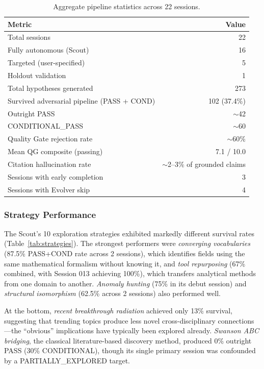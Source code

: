 \begin{table}[htbp]
\centering
\caption{Aggregate pipeline statistics across 22 sessions.}
\label{tab:aggregate}
\small
\begin{tabular}{@{}lr@{}}
\toprule
\textbf{Metric} & \textbf{Value} \\
\midrule
Total sessions & 22 \\
\quad Fully autonomous (Scout) & 16 \\
\quad Targeted (user-specified) & 5 \\
\quad Holdout validation & 1 \\
Total hypotheses generated & 273 \\
Survived adversarial pipeline (PASS + COND) & 102 (37.4\%) \\
\quad Outright PASS & $\sim$42 \\
\quad CONDITIONAL\_PASS & $\sim$60 \\
Quality Gate rejection rate & $\sim$60\% \\
Mean QG composite (passing) & 7.1 / 10.0 \\
Citation hallucination rate & $\sim$2--3\% of grounded claims \\
Sessions with early completion & 3 \\
Sessions with Evolver skip & 4 \\
\bottomrule
\end{tabular}
\end{table}

\subsubsection{Strategy Performance}

The Scout's 10 exploration strategies exhibited markedly different survival rates (Table~\ref{tab:strategies}). The strongest performers were \emph{converging vocabularies} (87.5\% PASS+COND rate across 2 sessions), which identifies fields using the same mathematical formalism without knowing it, and \emph{tool repurposing} (67\% combined, with Session 013 achieving 100\%), which transfers analytical methods from one domain to another. \emph{Anomaly hunting} (75\% in its debut session) and \emph{structural isomorphism} (62.5\% across 2 sessions) also performed well.

At the bottom, \emph{recent breakthrough radiation} achieved only 13\% survival, suggesting that trending topics produce less novel cross-disciplinary connections---the ``obvious'' implications have typically been explored already. \emph{Swanson ABC bridging}, the classical literature-based discovery method, produced 0\% outright PASS (30\% CONDITIONAL), though its single primary session was confounded by a PARTIALLY\_EXPLORED target.

